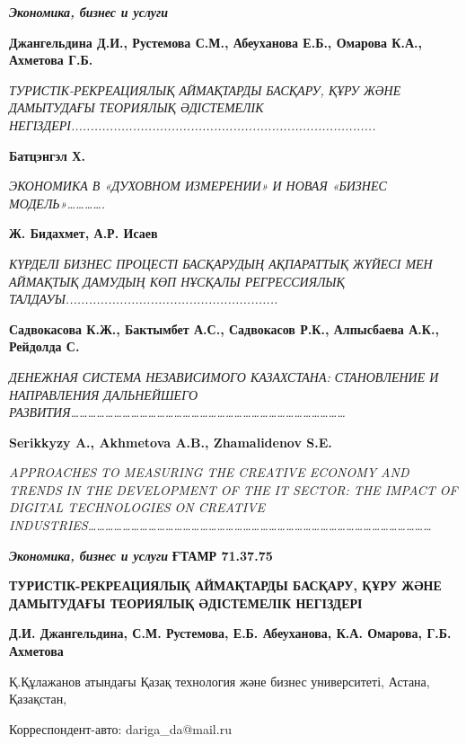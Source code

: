 \emph{{\bfseries Экономика, бизнес и услуги}}

{\bfseries Джангельдина Д.И., Рустемова С.М., Абеуханова Е.Б., Омарова
К.А., Ахметова Г.Б.}

\emph{ТУРИСТІК-РЕКРЕАЦИЯЛЫҚ АЙМАҚТАРДЫ БАСҚАРУ, ҚҰРУ ЖӘНЕ ДАМЫТУДАҒЫ
ТЕОРИЯЛЫҚ ӘДІСТЕМЕЛІК
НЕГІЗДЕРІ...............................................................................}

{\bfseries Батцэнгэл Х.}

\emph{ЭКОНОМИКА В «ДУХОВНОМ ИЗМЕРЕНИИ» И НОВАЯ «БИЗНЕС
МОДЕЛЬ»\ldots\ldots\ldots\ldots.}

{\bfseries Ж. Бидахмет, А.Р. Исаев}

\emph{КҮРДЕЛІ БИЗНЕС ПРОЦЕСТІ БАСҚАРУДЫҢ АҚПАРАТТЫҚ ЖҮЙЕСІ МЕН АЙМАҚТЫҚ
ДАМУДЫҢ КӨП НҰСҚАЛЫ РЕГРЕССИЯЛЫҚ
ТАЛДАУЫ.......................................................}

{\bfseries Садвокасова К.Ж., Бактымбет А.С., Садвокасов Р.К., Алпысбаева
А.К., Рейдолда С.}

\emph{ДЕНЕЖНАЯ СИСТЕМА НЕЗАВИСИМОГО КАЗАХСТАНА: СТАНОВЛЕНИЕ И
НАПРАВЛЕНИЯ ДАЛЬНЕЙШЕГО
РАЗВИТИЯ\ldots\ldots\ldots\ldots\ldots\ldots\ldots\ldots\ldots\ldots\ldots\ldots\ldots\ldots\ldots\ldots\ldots\ldots\ldots\ldots\ldots\ldots\ldots\ldots\ldots\ldots\ldots\ldots\ldots\ldots\ldots\ldots{}}

{\bfseries Serikkyzy A., Akhmetova A.B., Zhamalidenov S.E.}

\emph{APPROACHES TO MEASURING THE CREATIVE ECONOMY AND TRENDS IN THE
DEVELOPMENT OF THE IT SECTOR: THE IMPACT OF DIGITAL TECHNOLOGIES ON
CREATIVE
INDUSTRIES\ldots\ldots\ldots\ldots\ldots\ldots\ldots\ldots\ldots\ldots\ldots\ldots\ldots\ldots\ldots\ldots\ldots\ldots\ldots\ldots\ldots\ldots\ldots\ldots\ldots\ldots\ldots\ldots\ldots\ldots\ldots\ldots\ldots\ldots\ldots\ldots\ldots\ldots\ldots\ldots{}}

\emph{{\bfseries Экономика, бизнес и услуги}}\newpage
{\bfseries ҒТАМР 71.37.75}

{\bfseries ТУРИСТІК-РЕКРЕАЦИЯЛЫҚ АЙМАҚТАРДЫ БАСҚАРУ, ҚҰРУ ЖӘНЕ ДАМЫТУДАҒЫ
ТЕОРИЯЛЫҚ ӘДІСТЕМЕЛІК НЕГІЗДЕРІ}

{\bfseries Д.И. Джангельдина, С.М. Рустемова, Е.Б. Абеуханова, К.А.
Омарова, Г.Б. Ахметова}

Қ.Құлажанов атындағы Қазақ технология және бизнес университеті, Астана,
Қазақстан,

Корреспондент-авто: dariga\_da@mail.ru

